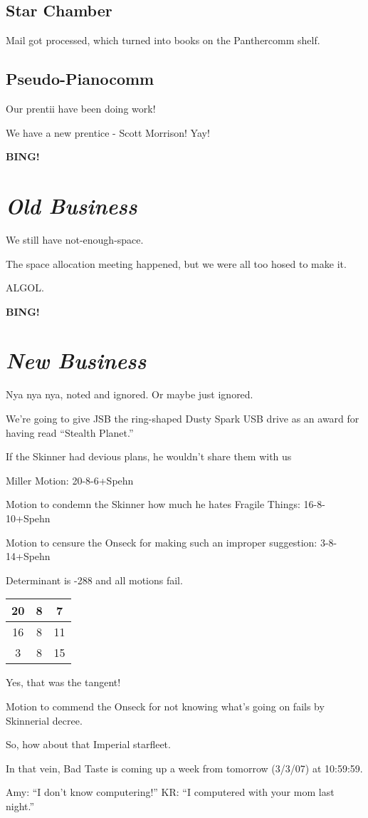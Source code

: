 \documentclass[10pt]{article}
\newcommand{\bing}{{\bf BING!} }
\newcommand{\goto}[1]{\bing \vskip 12pt \section*{{\em{#1}}}}
\begin{document}
\subsection*{Star Chamber}

Mail got processed, which turned into books on the Panthercomm shelf.

\subsection*{Pseudo-Pianocomm}

Our prentii have been doing work!

We have a new prentice - Scott Morrison!  Yay!

\goto{Old Business}

We still have not-enough-space.

The space allocation meeting happened, but we were all too hosed to make it.

ALGOL.

\goto{New Business}

Nya nya nya, noted and ignored.  Or maybe just ignored.

We're going to give JSB the ring-shaped Dusty Spark USB drive as an award for having read ``Stealth Planet.''

If the Skinner had devious plans, he wouldn't share them with us

Miller Motion: 20-8-6+Spehn

Motion to condemn the Skinner how much he hates Fragile Things: 16-8-10+Spehn

Motion to censure the Onseck for making such an improper suggestion: 3-8-14+Spehn

Determinant is -288 and all motions fail.

\begin{tabular}{|c|c|c|}
\hline
20 & 8 & 7 \\
\hline
16 & 8 & 11 \\
\hline
3 & 8 & 15 \\
\hline
\end{tabular}

Yes, that was the tangent!

Motion to commend the Onseck for not knowing what's going on fails by Skinnerial decree.

So, how about that Imperial starfleet. 

In that vein, Bad Taste is coming up a week from tomorrow (3/3/07) at 10:59:59.

Amy: ``I don't know computering!''  KR: ``I computered with your mom last night.''
\end{document}
